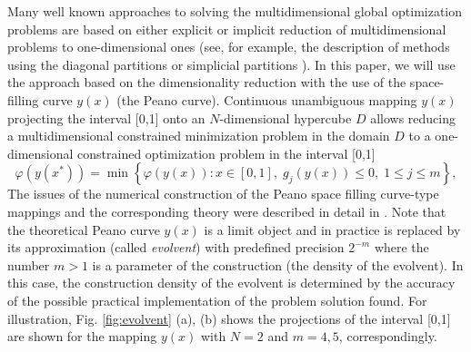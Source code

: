 \documentclass[review]{elsarticle}
\begin{document}
	Many well known approaches to solving the multidimensional global optimization problems are based on either explicit or implicit reduction of multidimensional problems to one-dimensional ones (see, for example, the description of methods using the diagonal partitions \cite{Sergeyev2006} or simplicial partitions \cite{Zilinskas2008}). In this paper, we will use the approach based on the dimensionality reduction with the use of the space-filling curve $y(x)$ (the Peano curve). Continuous unambiguous mapping $y(x)$ projecting the interval [0,1] onto an $N$-dimensional hypercube $D$ allows reducing a multidimensional constrained minimization problem in the domain $D$ to a one-dimensional constrained optimization problem in the interval [0,1]
\begin{equation}\label{one_dimensional_problem}
	\varphi(y(x^\ast))=\min \left\{\varphi(y(x)): x \in [0,1], \; g_j(y(x))\leq 0, \; 1 \leq j \leq m\right\},
\end{equation}
The issues of the numerical construction of the Peano space filling curve-type mappings and the corresponding theory were described in detail in \cite{Strongin2000, Sergeyev2013}. Note that the theoretical Peano curve $y(x)$ is a limit object and in practice is replaced by its approximation (called \textit{evolvent}) with predefined precision $2^{-m}$ where the number $m>1$ is a parameter of the construction (the density of the evolvent). In this case, the construction density of the evolvent is determined by the accuracy of the possible practical implementation of the problem solution found. For  illustration, Fig. \ref{fig:evolvent} (a), (b) shows the projections of the interval [0,1] are shown for the mapping $y(x)$ with $N=2$ and $m=4,5$, correspondingly.
\end{document}
